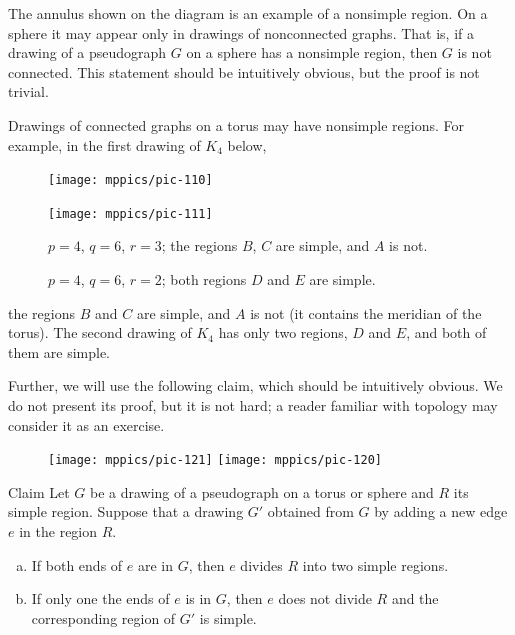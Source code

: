 The annulus shown on the diagram is an example of a nonsimple region.
On a sphere it may appear only in drawings of nonconnected graphs.
That is, if a drawing of a pseudograph $G$ on a sphere has a nonsimple region, then $G$ is not connected.
This statement should be intuitively obvious, but the proof is not trivial.  

Drawings of connected graphs on a torus may have nonsimple regions.
For example, in the first drawing of $K_4$ below,
\begin{figure}[ht!]
\begin{minipage}{.45\textwidth}
\centering
\texttt{[image: mppics/pic-110]}
\end{minipage}
\hfill
\begin{minipage}{.45\textwidth}
\centering
\texttt{[image: mppics/pic-111]}
\end{minipage}

\medskip

\begin{minipage}{.45\textwidth}
\centering
\caption*{$p=4$, $q=6$, $r=3$; the regions $B$, $C$ are simple, and $A$ is not.}
\end{minipage}\hfill
\begin{minipage}{.45\textwidth}
\centering
\caption*{$p=4$, $q=6$, $r=2$; both regions $D$ and $E$ are simple.}
\end{minipage}
\vskip-4mm
\end{figure} 
the regions $B$ and $C$ are simple, and $A$ is not (it contains the meridian of the torus).
The second drawing of $K_4$ has only two regions, $D$ and $E$, and both of them are simple.


Further, we will use the following claim, which should be intuitively obvious.
We do not present its proof, but it is not hard;
a reader familiar with topology may consider it as an exercise.

{

\begin{figure}
\vskip-4mm
\centering
\texttt{[image: mppics/pic-121]}
\medskip
\texttt{[image: mppics/pic-120]}
\end{figure}

\begin{thm}{Claim}\label{clm:cut}
Let $G$ be a drawing of a pseudograph on a torus or sphere and $R$ its simple region.
Suppose that a drawing $G'$ obtained from $G$ by adding a new edge $e$ in the region $R$.
\begin{enumerate}[(a)]
\item If both ends of $e$ are in $G$, then $e$ divides $R$ into two simple regions.
\item If only one the ends of $e$ is in $G$, then $e$ does not divide $R$ and the corresponding region of $G'$ is simple.
\end{enumerate}
\end{thm}

}


